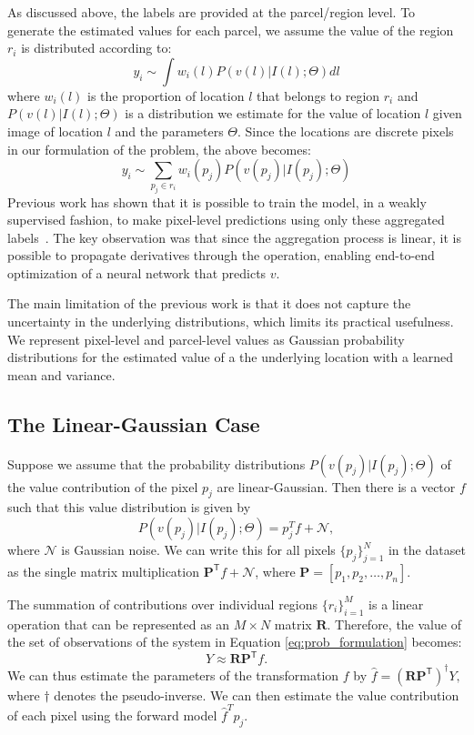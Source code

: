 \documentclass[10pt,twocolumn,letterpaper]{article}
\begin{document}
As discussed above, the labels are provided at the parcel/region level. To generate the estimated values for each parcel, we assume the value of the region $r_i$ is distributed according to:
\begin{equation}
    y_i \sim \int w_i(l) P(v(l)|I(l); \Theta) dl 
\end{equation}
where $w_i(l)$ is the proportion of location $l$ that belongs to region $r_i$ and $P(v(l)|I(l); \Theta)$ is a distribution we estimate for the value of location $l$ given image of location $l$ and the parameters $\Theta$. Since the locations are discrete pixels in our formulation of the problem, the above becomes:
\begin{equation}
\label{eq:prob_formulation}
    y_i \sim \sum _{p_j \in r_i}w_i(p_j) P(v(p_j)|I(p_j); \Theta) 
\end{equation}
Previous work has shown that it is possible to train the model, in a weakly supervised fashion, to make pixel-level predictions using only these aggregated labels~\cite{jacobs2018weakly}. The key observation was that since the aggregation process is linear, it is possible to propagate derivatives through the operation, enabling end-to-end optimization of a neural network that predicts $v$. 

The main limitation of the previous work is that it does not capture the uncertainty in the underlying distributions, which limits its practical usefulness. We represent pixel-level and parcel-level values as Gaussian probability distributions for the estimated value of a the underlying location with a learned mean and variance.

\subsection{The Linear-Gaussian Case}

Suppose we assume that the probability distributions $P(v(p_j)|I(p_j); \Theta)$ of the value contribution of the pixel $p_j$ are linear-Gaussian. Then there is a vector $f$ such that this value distribution is given by
\begin{equation}
    P(v(p_j)|I(p_j); \Theta) = p_j^T f + \mathcal{N},
\end{equation} where $\mathcal{N}$ is Gaussian noise. We can write this for all pixels $\{p_j\}_{j=1}^N$ in the dataset as the single matrix multiplication $\mathbf{P}^{\mathsf{T}} f + \mathcal{N}$, where $\mathbf{P} = [p_1,p_2, \ldots, p_n]$.

The summation of contributions over individual regions $\{r_i\}_{i=1}^M$ is a linear operation that can be represented as an $M\times N$ matrix $\mathbf{R}$. Therefore, the value of the set of observations of the system in Equation \ref{eq:prob_formulation} becomes:
\begin{equation}
    Y \approx \mathbf{R}\mathbf{P}^{\mathsf{T}} f.
\end{equation}
We can thus estimate the parameters of the transformation $f$ by $ \hat{f} = \left(\mathbf{R}\mathbf{P}^{\mathsf{T}}\right)^\dagger Y,$ where $\dagger$ denotes the pseudo-inverse. We can then estimate the value contribution of each pixel using the forward model $\hat{f}^T p_j.$
\end{document}
